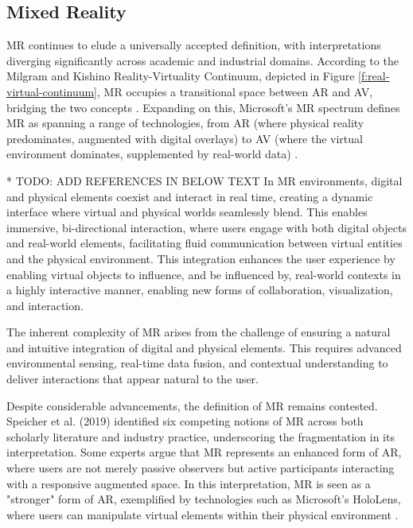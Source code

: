 \subsection{Mixed Reality}
\label{subsection:digital-realities}
   
    \ac{MR} continues to elude a universally accepted definition, with interpretations diverging significantly across academic and industrial domains. According to the Milgram and Kishino Reality-Virtuality Continuum, depicted in Figure \ref{f:real-virtual-continuum}, \ac{MR} occupies a transitional space between \ac{AR} and \ac{AV}, bridging the two concepts \cite{milgram1994}. Expanding on this, Microsoft’s \ac{MR} spectrum defines \ac{MR} as spanning a range of technologies, from \ac{AR} (where physical reality predominates, augmented with digital overlays) to \ac{AV} (where the virtual environment dominates, supplemented by real-world data) \cite{microsoft_mixed_reality}. 

    * TODO: ADD REFERENCES IN BELOW TEXT
    In \ac{MR} environments, digital and physical elements coexist and interact in real time, creating a dynamic interface where virtual and physical worlds seamlessly blend. This enables immersive, bi-directional interaction, where users engage with both digital objects and real-world elements, facilitating fluid communication between virtual entities and the physical environment. This integration enhances the user experience by enabling virtual objects to influence, and be influenced by, real-world contexts in a highly interactive manner, enabling new forms of collaboration, visualization, and interaction.

    The inherent complexity of \ac{MR} arises from the challenge of ensuring a natural and intuitive integration of digital and physical elements. This requires advanced environmental sensing, real-time data fusion, and contextual understanding to deliver interactions that appear natural to the user. 

    Despite considerable advancements, the definition of \ac{MR} remains contested. Speicher et al. (2019) identified six competing notions of \ac{MR} across both scholarly literature and industry practice, underscoring the fragmentation in its interpretation. Some experts argue that \ac{MR} represents an enhanced form of \ac{AR}, where users are not merely passive observers but active participants interacting with a responsive augmented space. In this interpretation, \ac{MR} is seen as a "stronger" form of \ac{AR}, exemplified by technologies such as Microsoft's HoloLens, where users can manipulate virtual elements within their physical environment \cite{whatismixedreality}.

